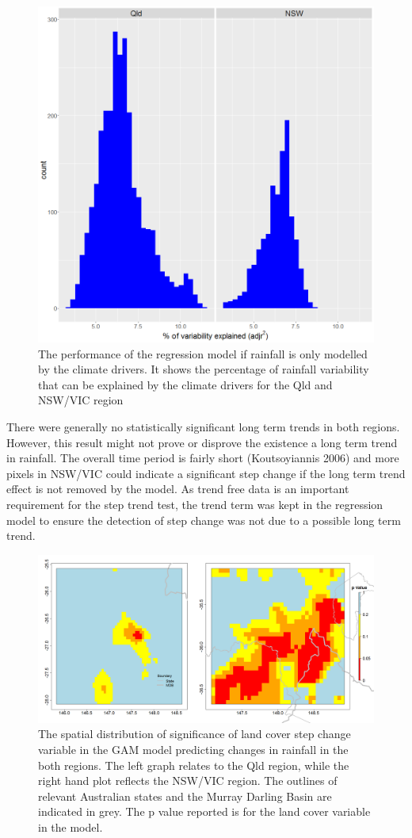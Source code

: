 \documentclass[fleqn,10pt,lineno]{wlpeerj} %
\begin{document}
\begin{figure}
\includegraphics[width=0.7\linewidth]{figures/soi_explhistogram} \caption{The performance of the regression model if rainfall is only modelled by the climate drivers. It shows the percentage of rainfall variability that can be explained by the climate drivers for the Qld and NSW/VIC region}\label{fig:rsq}
\end{figure}

There were generally no statistically significant long term trends in
both regions. However, this result might not prove or disprove the
existence a long term trend in rainfall. The overall time period is
fairly short (Koutsoyiannis 2006) and more pixels in NSW/VIC could
indicate a significant step change if the long term trend effect is not
removed by the model. As trend free data is an important requirement for
the step trend test, the trend term was kept in the regression model to
ensure the detection of step change was not due to a possible long term
trend.

\begin{figure}
\includegraphics[width=0.9\linewidth]{figures/Cp_30yrs} \caption{The spatial distribution of significance of land cover step change variable in the GAM model predicting changes in rainfall in the both regions. The left graph relates to the Qld region, while the right hand plot reflects the NSW/VIC region. The outlines of relevant Australian states and the Murray Darling Basin are indicated in grey.  The p value reported is for the land cover variable in the model.}\label{fig:LCp}
\end{figure}
\end{document}
